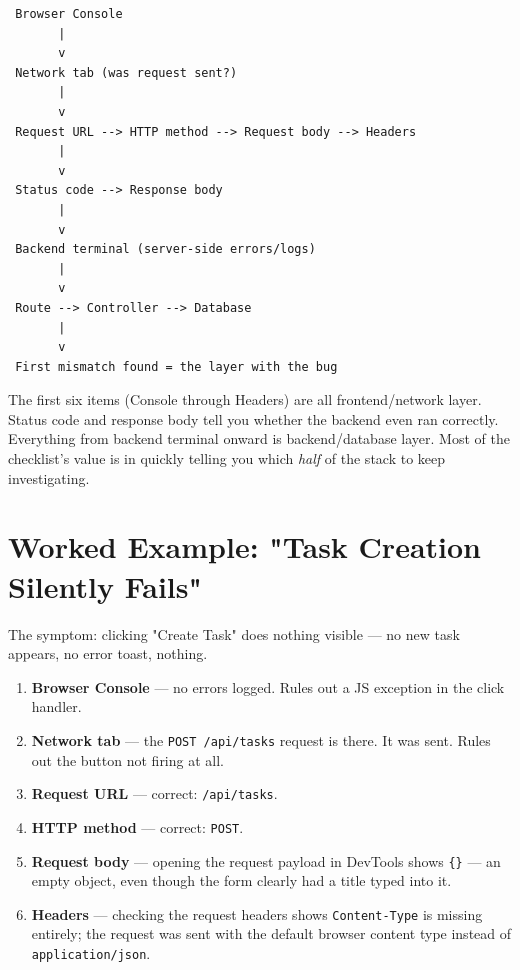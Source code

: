 \begin{diagrambox}
\begin{verbatim}
 Browser Console
       |
       v
 Network tab (was request sent?)
       |
       v
 Request URL --> HTTP method --> Request body --> Headers
       |
       v
 Status code --> Response body
       |
       v
 Backend terminal (server-side errors/logs)
       |
       v
 Route --> Controller --> Database
       |
       v
 First mismatch found = the layer with the bug
\end{verbatim}
\end{diagrambox}

\begin{notebox}[NOTE]
The first six items (Console through Headers) are all frontend/network
layer. Status code and response body tell you whether the backend even ran
correctly. Everything from backend terminal onward is backend/database
layer. Most of the checklist's value is in quickly telling you which
\emph{half} of the stack to keep investigating.
\end{notebox}

\section{Worked Example: "Task Creation Silently Fails"}

The symptom: clicking "Create Task" does nothing visible --- no new task
appears, no error toast, nothing.

\begin{enumerate}
\item \textbf{Browser Console} --- no errors logged. Rules out a JS
exception in the click handler.
\item \textbf{Network tab} --- the \texttt{POST /api/tasks} request is
there. It was sent. Rules out the button not firing at all.
\item \textbf{Request URL} --- correct: \texttt{/api/tasks}.
\item \textbf{HTTP method} --- correct: \texttt{POST}.
\item \textbf{Request body} --- opening the request payload in DevTools
shows \texttt{\{\}} --- an empty object, even though the form clearly had a
title typed into it.
\item \textbf{Headers} --- checking the request headers shows
\texttt{Content-Type} is missing entirely; the request was sent with the
default browser content type instead of \texttt{application/json}.
\end{enumerate}

